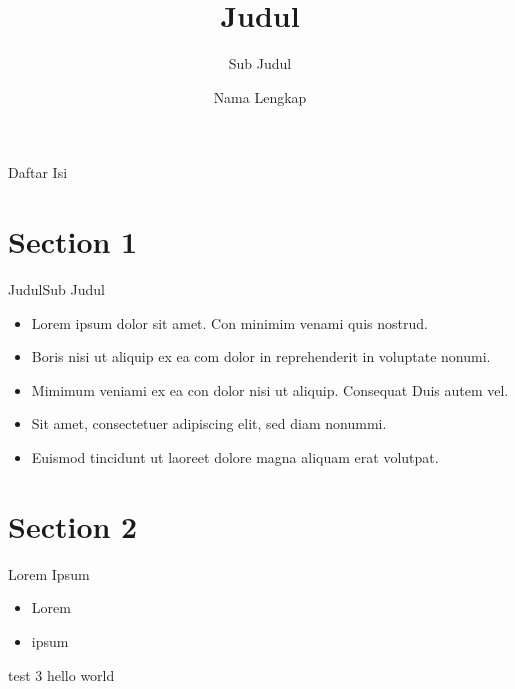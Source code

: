 \documentclass[aspectratio=169]{beamer}
\title{Judul}
\subtitle{Sub Judul}
\author{Nama Lengkap}
\begin{document}
\begin{frame}[plain]
  \titlepage
\end{frame}

\begin{frame}{Daftar Isi}
  \tableofcontents
\end{frame}

\section{Section 1}

\begin{frame}{Judul}{Sub Judul}
  \begin{itemize}
    \item Lorem ipsum dolor sit amet. Con minimim venami quis nostrud.
    \item Boris nisi ut aliquip ex ea com dolor in reprehenderit in voluptate nonumi.
    \item Mimimum veniami ex ea con dolor nisi ut aliquip. Consequat Duis autem vel.
    \item Sit amet, consectetuer adipiscing elit, sed diam nonummi.
    \item Euismod tincidunt ut laoreet dolore magna aliquam erat volutpat.
  \end{itemize}
\end{frame}

\section{Section 2}
\begin{frame}{Lorem Ipsum}{}
  \begin{itemize}
    \item Lorem
    \item ipsum
  \end{itemize}
\end{frame}

\begin{frame}{test 3}{}
  hello world
\end{frame}
\end{document}
